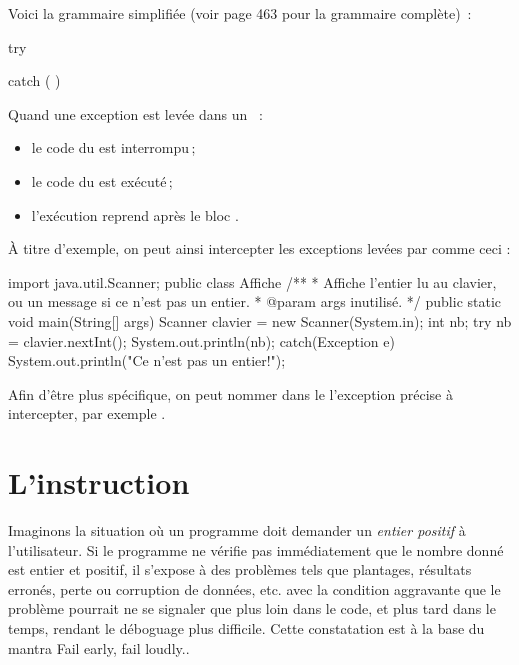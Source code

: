 Voici la grammaire simplifiée (voir \cite{jls9} page 463 pour la grammaire
complète)~:

\begin{grammaire}
	    try  


	    catch (  ) 
\end{grammaire}


Quand une exception est levée dans un ~:
\begin{itemize}
\item le code du  est interrompu\,;
\item le code du  est exécuté\,;
\item l'exécution reprend après le bloc .
\end{itemize}

À titre d'exemple, on peut ainsi intercepter les exceptions levées par  comme ceci :
\begin{java}
import java.util.Scanner;
public class Affiche {
  /**
   * Affiche l'entier lu au clavier, ou un message si ce n'est pas un entier.
   * @param args inutilisé.
   */
  public static void main(String[] args) {
      Scanner clavier = new Scanner(System.in);
      int nb;
      try { 
        nb = clavier.nextInt();
        System.out.println(nb);
      }
      catch(Exception e) { 
        System.out.println("Ce n'est pas un entier!");
      }
  }
}
\end{java}

Afin d'être plus spécifique, on peut nommer dans le  l'exception précise à intercepter, par exemple .


\section{L'instruction }
Imaginons la situation où un programme doit demander un \emph{entier positif} à l'utilisateur.
Si le programme ne vérifie pas immédiatement que le nombre donné est entier et positif, il s'expose à des problèmes tels que plantages, résultats erronés, perte ou corruption de données, etc.
avec la condition aggravante que le problème pourrait ne se signaler que plus loin dans le code, et plus tard dans le temps, rendant le déboguage plus difficile.
Cette constatation est à la base du mantra \og Fail early, fail loudly.\fg.

